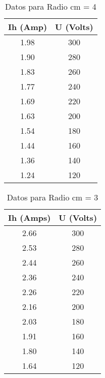 \documentclass[a4paper,12pt]{report}
\begin{document}
    \begin{table}[h]
        \centering
        \begin{tabular}{|c|c|}
            \hline
            \textbf{Ih (Amp)} & \textbf{U (Volts)} \\ \hline
            1.98 & 300 \\ \hline
            1.90 & 280 \\ \hline
            1.83 & 260 \\ \hline
            1.77 & 240 \\ \hline
            1.69 & 220 \\ \hline
            1.63 & 200 \\ \hline
            1.54 & 180 \\ \hline
            1.44 & 160 \\ \hline
            1.36 & 140 \\ \hline
            1.24 & 120 \\ \hline
        \end{tabular}
        \caption{Datos para Radio cm = 4}
    \end{table}
    
    \begin{table}[h]
        \centering
        \begin{tabular}{|c|c|}
            \hline
            \textbf{Ih (Amps)} & \textbf{U (Volts)} \\ \hline
            2.66 & 300 \\ \hline
            2.53 & 280 \\ \hline
            2.44 & 260 \\ \hline
            2.36 & 240 \\ \hline
            2.26 & 220 \\ \hline
            2.16 & 200 \\ \hline
            2.03 & 180 \\ \hline
            1.91 & 160 \\ \hline
            1.80 & 140 \\ \hline
            1.64 & 120 \\ \hline
        \end{tabular}
        \caption{Datos para Radio cm = 3}
    \end{table}
    
\end{document}
